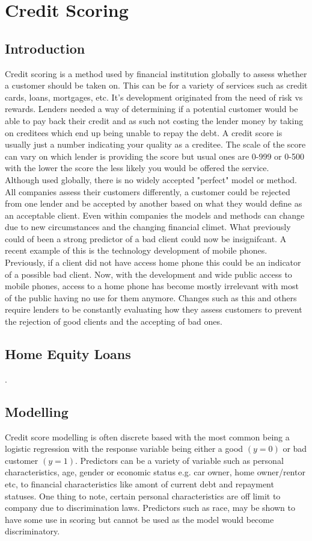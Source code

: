 \chapter{Credit Scoring}

\section{Introduction}
Credit scoring is a method used by financial institution globally to assess whether a customer should be taken on. This can be for a variety of services such as credit cards, loans, mortgages, etc. It's development originated from the need of risk vs rewards. Lenders needed a way of determining if a potential customer would be able to pay back their credit and as such not costing the lender money by taking on creditees which end up being unable to repay the debt. A credit score is usually just a number indicating your quality as a creditee. The scale of the score can vary on which lender is providing the score but usual ones are 0-999 or 0-500 with the lower the score the less likely you would be offered the service. \\

Although used globally, there is no widely accepted "perfect" model or method. All companies assess their customers differently, a customer could be rejected from one lender and be accepted by another based on what they would define as an acceptable client. Even within companies the models and methods can change due to new circumstances and the changing financial climet. What previously could of been a strong predictor of a bad client could now be insignifcant. A recent example of this is the technology development of mobile phones. Previously, if a client did not have access home phone this could be an indicator of a possible bad client. Now, with the development and wide public access to mobile phones, access to a home phone has become mostly irrelevant with most of the public having no use for them anymore. Changes such as this and others require lenders to be constantly evaluating how they assess customers to prevent the rejection of good clients and the accepting of bad ones.

\section{Home Equity Loans}
.

\section{Modelling}
Credit score modelling is often discrete based with the most common being a logistic regression with the response variable being either a good $(y=0)$ or bad customer $(y=1)$. Predictors can be a variety of variable such as personal characteristics, age, gender or economic status e.g. car owner, home owner/rentor etc, to financial characteristics like amont of current debt and repayment statuses. One thing to note, certain personal characteristics are off limit to company due to discrimination laws. Predictors such as race, may be shown to have some use in scoring but cannot be used as the model would become discriminatory.